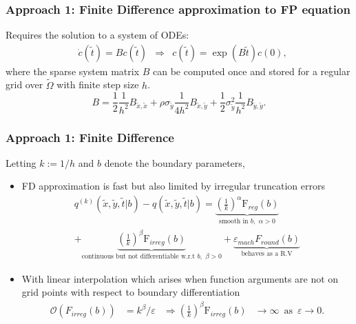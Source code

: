 \documentclass{beamer}
\begin{document}
\begin{frame}
  \frametitle{Approach 1: Finite Difference approximation to FP equation}
  Requires the solution to a system of ODEs:
  \begin{align*}
    & \dot{c}(\tilde{t}) = Bc(\tilde{t}) &\Rightarrow& c(\tilde{t}) = \exp\left(B\tilde{t}\right)c(0), 
  \end{align*}
  where the sparse system matrix $B$ can be computed once and stored for a regular grid over $\tilde{\Omega}$ with finite step size $h$. 
  \[ B = \frac{1}{2} \frac{1}{h^2}B_{\tilde{x},\tilde{x}} +
    \rho\sigma_{\tilde{y}} \frac{1}{4h^2}B_{\tilde{x},\tilde{y}} +
    \frac{1}{2}\sigma_{\tilde{y}}^2
    \frac{1}{h^2}B_{\tilde{y},\tilde{y}}.
\]
\end{frame}
\begin{frame}
  \frametitle{Approach 1: Finite Difference}
  Letting $k := 1/h$ and $b$ denote the boundary parameters, 
\begin{itemize}
  \item FD approximation is fast but also limited by irregular truncation errors
  \begin{multline*}
    q^{(k)}(\tilde{x},\tilde{y},\tilde{t} | b) - q(\tilde{x},\tilde{y},\tilde{t} | b) = \underbrace{\left( \frac{1}{k}
    \right)^{\alpha} \mbox{F}_{reg}(b)}_{\mbox{smooth in } b, \,\,\alpha > 0} \\
    + \underbrace{\left( \frac{1}{k}\right)^{\beta}\mbox{F}_{irreg}(b)}_{\mbox{continuous but not differentiable w.r.t }b, \,\, \beta > 0} + \underbrace{\varepsilon_{mach}F_{round}(b)}_{\mbox{behaves as a R.V}}
  \end{multline*}
\item With linear interpolation which arises when function arguments
  are not on grid points with respect to boundary differentiation
  \begin{align*}
    \mathcal{O}(F_{irreg}(b)) &= k^\beta/\varepsilon &\Rightarrow \left( \frac{1}{k}\right)^{\beta}\mbox{F}_{irreg}(b) &\to \infty \,\,\, \mbox{as} \,\,\, \varepsilon \to 0.
  \end{align*}
\end{itemize}
\end{frame}
\end{document}
